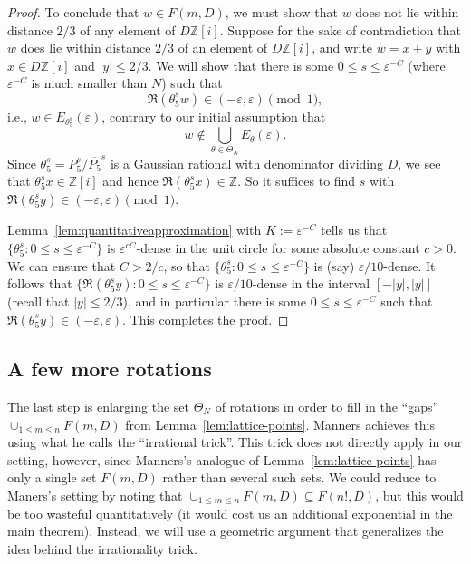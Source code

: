 \documentclass[11pt]{amsart}
\theoremstyle{definition}
\begin{document}
\begin{proof}
To conclude that $w \in F(m,D)$, we must show that $w$ does not lie within distance $2/3$ of any element of $D\mathbb{Z}[i]$.  Suppose for the sake of contradiction that $w$ does lie within distance $2/3$ of an element of $D\mathbb{Z}[i]$, and write $w=x+y$ with $x \in D\mathbb{Z}[i]$ and $|y| \leq 2/3$.  We will show that there is some $0 \leq s \leq \varepsilon^{-C}$ (where $\varepsilon^{-C}$ is much smaller than $N$) such that $$\Re(\theta_5^s w) \in (-\varepsilon,\varepsilon) \pmod{1},$$ i.e., $w \in E_{\theta_5^s}(\varepsilon)$, contrary to our initial assumption that $$w \notin \bigcup_{\theta \in \Theta_N}E_\theta(\varepsilon).$$
Since $\theta_5^s=P_5^s/\overline{P_5}^s$ is a Gaussian rational with denominator dividing $D$, we see that $\theta_5^s x \in \mathbb{Z}[i]$ and hence $\Re(\theta_5^s x) \in \mathbb{Z}$.  So it suffices to find $s$ with $\Re(\theta_5^s y) \in (-\varepsilon,\varepsilon) \pmod{1}$.

Lemma~\ref{lem:quantitativeapproximation} with $K:=\varepsilon^{-C}$ tells us that $\{\theta_5^s: 0 \leq s \leq \varepsilon^{-C}\}$ is $\varepsilon^{cC}$-dense in the unit circle for some absolute constant $c>0$.  We can ensure that $C>2/c$, so that $\{\theta_5^s: 0 \leq s \leq \varepsilon^{-C}\}$ is (say) $\varepsilon/10$-dense.  It follows that $\{\Re(\theta_5^s y): 0 \leq s \leq \varepsilon^{-C}\}$ is $\varepsilon/10$-dense in the interval $[-|y|, |y|]$ (recall that $|y| \leq 2/3$), and in particular there is some $0 \leq s \leq \varepsilon^{-C}$ such that $\Re(\theta_5^s y) \in (-\varepsilon, \varepsilon)$.  This completes the proof.
\end{proof}



\subsection{A few more rotations}

The last step is enlarging the set $\Theta_N$ of rotations in order to fill in the ``gaps'' $\cup_{1 \leq m \leq n}F(m,D)$ from Lemma~\ref{lem:lattice-points}.  Manners achieves this using what he calls the ``irrational trick''.  This trick does not directly apply in our setting, however, since Manners's analogue of Lemma~\ref{lem:lattice-points} has only a single set $F(m,D)$ rather than several such sets.  We could reduce to Maners's setting by noting that $\cup_{1 \leq m \leq n}F(m,D) \subseteq F(n!,D)$, but this would be too wasteful quantitatively (it would cost us an additional exponential in the main theorem).  Instead, we will use a geometric argument that generalizes the idea behind the irrationality trick.
\end{document}
